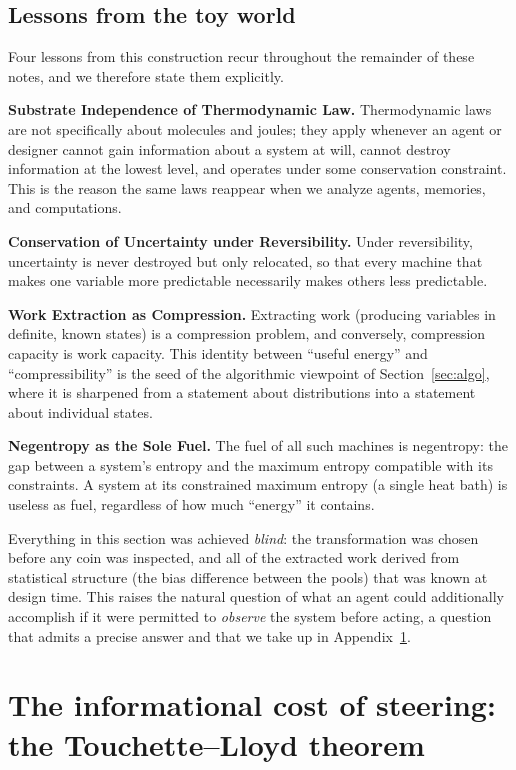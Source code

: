 \documentclass[10pt]{article}
\theoremstyle{definition}
\theoremstyle{remark}
\begin{document}
\subsection{Lessons from the toy world}
\label{sec:cointeach}

Four lessons from this construction recur throughout the remainder of these notes, and we therefore state them explicitly.

\textbf{Substrate Independence of Thermodynamic Law.} Thermodynamic laws are not specifically about molecules and joules; they apply whenever an agent or designer cannot gain information about a system at will, cannot destroy information at the lowest level, and operates under some conservation constraint. This is the reason the same laws reappear when we analyze agents, memories, and computations.

\textbf{Conservation of Uncertainty under Reversibility.} Under reversibility, uncertainty is never destroyed but only relocated, so that every machine that makes one variable more predictable necessarily makes others less predictable.

\textbf{Work Extraction as Compression.} Extracting work (producing variables in definite, known states) is a compression problem, and conversely, compression capacity is work capacity. This identity between ``useful energy'' and ``compressibility'' is the seed of the algorithmic viewpoint of Section~\ref{sec:algo}, where it is sharpened from a statement about distributions into a statement about individual states.

\textbf{Negentropy as the Sole Fuel.} The fuel of all such machines is negentropy: the gap between a system's entropy and the maximum entropy compatible with its constraints. A system at its constrained maximum entropy (a single heat bath) is useless as fuel, regardless of how much ``energy'' it contains.

Everything in this section was achieved \emph{blind}: the transformation was chosen before any coin was inspected, and all of the extracted work derived from statistical structure (the bias difference between the pools) that was known at design time. This raises the natural question of what an agent could additionally accomplish if it were permitted to \emph{observe} the system before acting, a question that admits a precise answer and that we take up in Appendix~\ref{sec:tl}.
\section{The informational cost of steering: the Touchette--Lloyd theorem}
\label{sec:tl}
\end{document}
